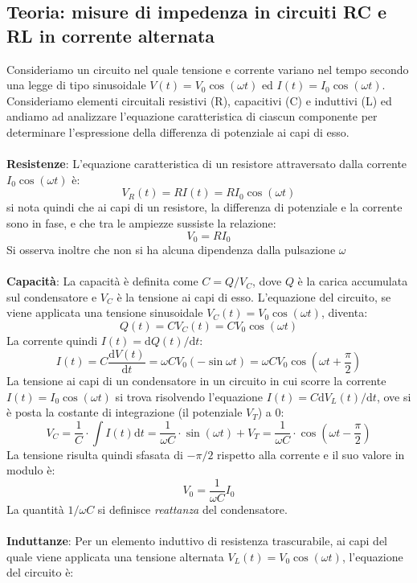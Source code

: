 \subsection{Teoria: misure di impedenza in circuiti RC e RL in corrente alternata}

Consideriamo un circuito nel quale tensione e corrente variano nel tempo secondo una legge di tipo sinusoidale $V(t)=V_0 \cos(\omega t)$ ed $I(t)=I_0 \cos(\omega t)$. Consideriamo elementi circuitali resistivi (R), capacitivi (C) e induttivi (L) ed andiamo ad analizzare l'equazione caratteristica di ciascun componente per determinare l'espressione della differenza di potenziale ai capi di esso.\\\\
%
\textbf{Resistenze}:
L'equazione caratteristica di un resistore attraversato dalla corrente $I_0\cos(\omega t)$ è: 
    $$V_R (t) = RI(t) = RI_0 \cos(\omega t)$$
si nota quindi che ai capi di un resistore, la differenza di potenziale e la corrente sono in fase, e che tra le ampiezze sussiste la relazione:  
    $$V_0 = RI_0$$
Si osserva inoltre che non si ha alcuna dipendenza dalla pulsazione $\omega$\\\\
%
\textbf{Capacità}:
La capacità è definita come $C = Q/V_C$, dove $Q$ è la carica accumulata sul condensatore e $V_C$ è la tensione ai capi di esso. L'equazione del circuito, se viene applicata una tensione sinusoidale $V_C(t)=V_0 \cos(\omega t)$, diventa:
    $$Q(t) = CV_C(t) = CV_0 \cos(\omega t) $$
%    
La corrente quindi $I(t)=\mathrm{d}Q(t)/\mathrm{d}t$:
    $$I(t) = C \frac{\mathrm{d}V(t)}{\mathrm{d}t} = \omega C V_0 (-\sin \omega t) = \omega C V_0 \cos \left(\omega t + \frac{\pi}{2}\right) $$
%
La tensione ai capi di un condensatore in un circuito in cui scorre la corrente $I(t)=I_0 \cos(\omega t)$ si trova risolvendo l'equazione $I(t)=C\mathrm{d}V_L(t)/\mathrm{d}t$, ove si è posta la costante di integrazione (il potenziale $V_T$) a 0:
    $$V_C = \frac{1}{C} \!\cdot{}\!\!\!\! \int \!I(t) \mathrm{d}t = \frac{1}{\omega C} \!\cdot{}\! \sin(\omega t)  + V_T = \frac{1}{\omega C} \!\cdot{}\! \cos \left(\omega t - \frac{\pi}{2}\right)$$
%
La tensione risulta quindi sfasata di $-\pi/2$ rispetto alla corrente e il suo valore in modulo è:
    $$V_0 = \frac{1}{\omega C} I_0$$
%    
La quantità $1/\omega C$ si definisce \textit{reattanza} del condensatore.\\\\
%
\textbf{Induttanze}:
Per un elemento induttivo di resistenza trascurabile, ai capi del quale viene applicata una tensione alternata $V_L(t) = V_0 \cos(\omega t)$,  l'equazione del circuito è:

